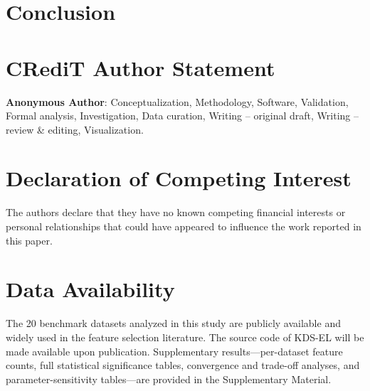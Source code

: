 \documentclass[a4paper,fleqn]{cas-dc}
\begin{document}










\section{Conclusion}\label{sec:conclusion}


\section*{CRediT Author Statement}
\textbf{Anonymous Author}: Conceptualization, Methodology, Software, Validation, Formal analysis, Investigation, Data curation, Writing -- original draft, Writing -- review \& editing, Visualization.

\section*{Declaration of Competing Interest}
The authors declare that they have no known competing financial interests or personal relationships that could have appeared to influence the work reported in this paper.

\section*{Data Availability}
The 20 benchmark datasets analyzed in this study are publicly available and widely used in the feature selection literature. The source code of KDS-EL will be made available upon publication. Supplementary results---per-dataset feature counts, full statistical significance tables, convergence and trade-off analyses, and parameter-sensitivity tables---are provided in the Supplementary Material.



\end{document}
